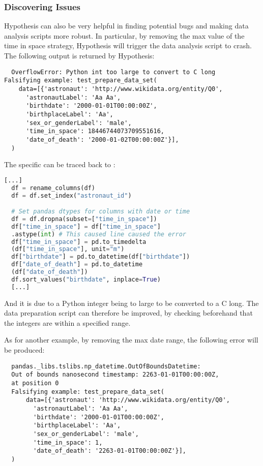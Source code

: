 \documentclass[runningheads]{llncs}
\begin{document}
\subsubsection{Discovering Issues}
Hypothesis can also be very helpful in finding potential bugs and making data analysis scripts more robust. In particular, by removing the max value of the time in space strategy, Hypothesis will trigger the data analysis script to crash. The following output is returned by Hypothesis:

\begin{verbatim}
  OverflowError: Python int too large to convert to C long
Falsifying example: test_prepare_data_set(
    data=[{'astronaut': 'http://www.wikidata.org/entity/Q0',
      'astronautLabel': 'Aa Aa',
      'birthdate': '2000-01-01T00:00:00Z',
      'birthplaceLabel': 'Aa',
      'sex_or_genderLabel': 'male',
      'time_in_space': 18446744073709551616,
      'date_of_death': '2000-01-02T00:00:00Z'}],
  )
\end{verbatim}

The specific can be traced back to :

\begin{lstlisting}[language=Python]
  [...]
  df = rename_columns(df)
  df = df.set_index("astronaut_id")

  # Set pandas dtypes for columns with date or time
  df = df.dropna(subset=["time_in_space"])
  df["time_in_space"] = df["time_in_space"]
  .astype(int) # This caused line caused the error
  df["time_in_space"] = pd.to_timedelta
  (df["time_in_space"], unit="m")
  df["birthdate"] = pd.to_datetime(df["birthdate"])
  df["date_of_death"] = pd.to_datetime
  (df["date_of_death"])
  df.sort_values("birthdate", inplace=True)
  [...]
\end{lstlisting}

And it is due to a Python integer being to large to be converted to a C long. The data preparation script can therefore be improved, by checking beforehand that the integers are within a specified range.

As for another example, by removing the max date range, the following error will be produced:

\begin{verbatim}
  pandas._libs.tslibs.np_datetime.OutOfBoundsDatetime: 
  Out of bounds nanosecond timestamp: 2263-01-01T00:00:00Z, 
  at position 0
  Falsifying example: test_prepare_data_set(
      data=[{'astronaut': 'http://www.wikidata.org/entity/Q0',
        'astronautLabel': 'Aa Aa',
        'birthdate': '2000-01-01T00:00:00Z',
        'birthplaceLabel': 'Aa',
        'sex_or_genderLabel': 'male',
        'time_in_space': 1,
        'date_of_death': '2263-01-01T00:00:00Z'}],
  ) 
\end{verbatim}
\end{document}
